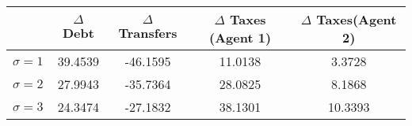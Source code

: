 \begin{tiny}\begin{tabular}{|l|c|c|c|c|}
\hline
&\textbf{$\Delta$ Debt}&\textbf{ $\Delta$  Transfers}&\textbf{$ \Delta $ Taxes (Agent 1)}&\textbf{$ \Delta $ Taxes(Agent 2)}\\\hline
\textbf{$\sigma=1$}&39.4539&-46.1595&11.0138&3.3728\\\hline
\textbf{$\sigma=2$}&27.9943&-35.7364&28.0825&8.1868\\\hline
\textbf{$\sigma=3$}&24.3474&-27.1832&38.1301&10.3393\\\hline
\end{tabular}
\end{tiny}
